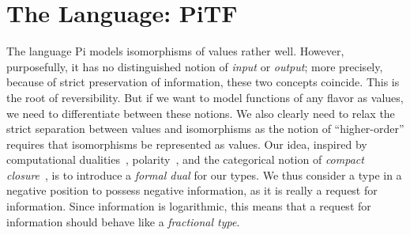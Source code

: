 \documentclass{llncs}
\newcommand{\roshan}[1]{\textsc{Roshan says:} 
  \textit{#1}
}
\begin{document}
\section{The Language: {{PiTF}} }

The language {{Pi}} models isomorphisms of values rather well.  However,
purposefully, it has no distinguished notion of \emph{input} or
\emph{output}; more precisely, because of strict preservation of information,
these two concepts coincide.  This is the root of reversibility. But if we
want to model functions of any flavor as values, we need to differentiate
between these notions. We also clearly need to relax the strict separation
between values and isomorphisms as the notion of ``higher-order'' requires
that isomorphisms be represented as values. Our idea, inspired by
computational dualities~\cite{Filinski:1989:DCI:648332.755574,Curien:2000},
polarity~\cite{Girard87tcs,10.1109/LICS.2010.23}, and the categorical notion
of \emph{compact
  closure}~\cite{Selinger:2007:DCC:1229185.1229207,Abramsky:2004:CSQ:1018438.1021878},
is to introduce a \emph{formal dual} for our types.  We thus consider a type
in a negative position to possess negative information, as it is really a
request for information.  Since information is logarithmic, this means that a
request for information should behave like a \emph{fractional type}.

%

\end{document}
